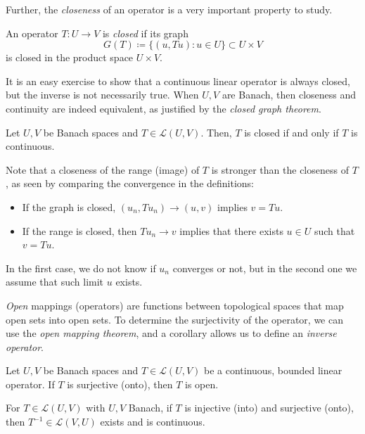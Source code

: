 Further, the \emph{closeness} of an operator is a very important property to study.
\begin{definition}
    An operator $T:U\to V$ is \emph{closed} if its graph 
    \begin{equation}
        G(T) \coloneqq \{(u,Tu):u\in U\}\subset U\times V
    \end{equation}
    is closed in the product space $U\times V$.
\end{definition}

It is an easy exercise to show that a continuous linear operator is always closed, but the inverse is not necessarily true. When $U, V$ are Banach, then closeness and continuity are indeed equivalent, as justified by the \emph{closed graph theorem}. 
\begin{theorem}\label{thm:closed-graph-theorem}
    Let $U,V$ be Banach spaces and $T\in\mathcal{L}(U,V)$. Then, $T$ is closed if and only if $T$ is continuous. 
\end{theorem}

Note that a closeness of the range (image) of $T$ is stronger than the closeness of $T$, as seen by comparing the convergence in the definitions: 
\begin{itemize}
    \item If the graph is closed, $(u_n, Tu_n)\to (u,v)$ implies $v=Tu$.
    \item If the range is closed, then $Tu_n\to v$ implies that there exists $u\in U$ such that $v=Tu$. 
\end{itemize}
In the first case, we do not know if $u_n$ converges or not, but in the second one we assume that such limit $u$ exists. 

\emph{Open} mappings (operators) are functions between topological spaces that map open sets into open sets. To determine the surjectivity of the operator, we can use the \emph{open mapping theorem}, and a corollary allows us to define an \emph{inverse operator}.

\begin{theorem}\label{thm:open-mapping-theorem}
    Let $U,V$ be Banach spaces and $T\in \mathcal{L}(U,V)$ be a continuous, bounded linear operator. If $T$ is surjective (onto), then $T$ is open. 
\end{theorem}
\begin{corollary}
    For $T\in\mathcal{L}(U,V)$ with $U,V$ Banach, if $T$ is injective (into) and surjective (onto), then $T^{-1}\in \mathcal{L}(V,U)$ exists and is continuous. 
\end{corollary}

